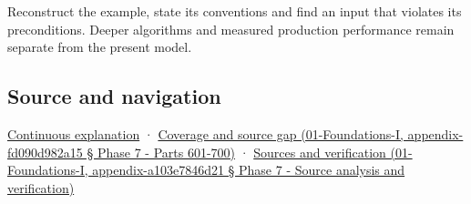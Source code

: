 Reconstruct the example, state its conventions and find an input that violates its preconditions. Deeper algorithms and measured production performance remain separate from the present model.

\subsection{Source and navigation}\label{source-and-navigation}

\href{Continuous\%20Notes/Computing\%20Foundations\%20-\%20From\%20Bits\%20to\%20C++\%20and\%20Systems\%20APIs\#Keep\%20the\%20promises\%20visible\%20while\%20moving\%20between\%20representations}{Continuous explanation} · \href{}{Coverage and source gap (01-Foundations-I, appendix-fd090d982a15 § Phase 7 - Parts 601-700)} · \href{}{Sources and verification (01-Foundations-I, appendix-a103e7846d21 § Phase 7 - Source analysis and verification)}
